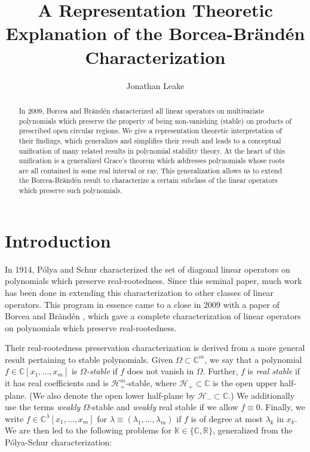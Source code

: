 \documentclass{article}
\title{A Representation Theoretic Explanation of the Borcea-Br{\"a}nd{\'e}n Characterization}
\author{Jonathan Leake}
\theoremstyle{definition}
\theoremstyle{plain}
\newcommand{\C}{\mathbb{C}}
\newcommand{\R}{\mathbb{R}}
\newcommand{\K}{\mathbb{K}}
\newcommand{\UHP}{\mathcal{H}_+}
\newcommand{\LHP}{\mathcal{H}_-}
\begin{document}
\maketitle

\begin{abstract}
    In 2009, Borcea and Br{\"a}nd{\'e}n characterized all linear operators on multivariate polynomials which preserve the property of being non-vanishing (stable) on products of prescribed open circular regions. We give a representation theoretic interpretation of their findings, which generalizes and simplifies their result and leads to a conceptual unification of many related results in polynomial stability theory. At the heart of this unification is a generalized Grace's theorem which addresses polynomials whose roots are all contained in some real interval or ray. This generalization allows us to extend the Borcea-Br{\"a}nd{\'e}n result to characterize a certain subclass of the linear operators which preserve such polynomials.
\end{abstract}

\section{Introduction}

In 1914, P{\'o}lya and Schur \cite{polya1914zwei} characterized the set of diagonal linear operators on polynomials which preserve real-rootedness. Since this seminal paper, much work has been done in extending this characterization to other classes of linear operators. This program in essence came to a close in 2009 with a paper of Borcea and Br{\"a}nd{\'e}n \cite{bb1}, which gave a complete characterization of linear operators on polynomials which preserve real-rootedness.

Their real-rootedness preservation characterization is derived from a more general result pertaining to stable polynomials. Given $\Omega \subset \C^m$, we say that a polynomial $f \in \C[x_1,\ldots,x_m]$ is \emph{$\Omega$-stable} if $f$ does not vanish in $\Omega$. Further, $f$ is \emph{real stable} if it has real coefficients and is $\UHP^m$-stable, where $\UHP \subset \C$ is the open upper half-plane. (We also denote the open lower half-plane by $\LHP \subset \C$.) We additionally use the terms \emph{weakly} $\Omega$-stable and \emph{weakly} real stable if we allow $f \equiv 0$. Finally, we write $f \in \C^\lambda[x_1,\ldots,x_m]$ for $\lambda \equiv (\lambda_1,\ldots,\lambda_m)$ if $f$ is of degree at most $\lambda_k$ in $x_k$. We are then led to the following problems for $\K \in \{\C,\R\}$, generalized from the P{\'o}lya-Schur characterization:
\end{document}
